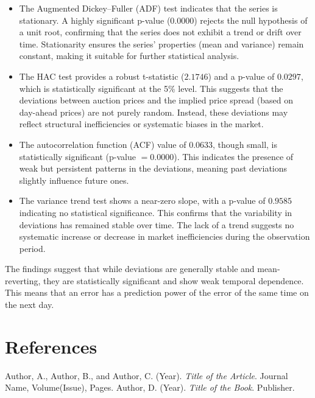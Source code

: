 \documentclass[12pt]{article}
\begin{document}
\begin{itemize}
    \item The Augmented Dickey--Fuller (ADF) test indicates that the series is stationary. A highly significant p-value ($0.0000$) rejects the null hypothesis of a unit root, confirming that the series does not exhibit a trend or drift over time. Stationarity ensures the series' properties (mean and variance) remain constant, making it suitable for further statistical analysis.

    \item The HAC test provides a robust t-statistic ($2.1746$) and a p-value of $0.0297$, which is statistically significant at the 5\% level. This suggests that the deviations between auction prices and the implied price spread (based on day-ahead prices) are not purely random. Instead, these deviations may reflect structural inefficiencies or systematic biases in the market.

    \item The autocorrelation function (ACF) value of $0.0633$, though small, is statistically significant (p-value $= 0.0000$). This indicates the presence of weak but persistent patterns in the deviations, meaning past deviations slightly influence future ones.

    \item The variance trend test shows a near-zero slope, with a p-value of $0.9585$ indicating no statistical significance. This confirms that the variability in deviations has remained stable over time. The lack of a trend suggests no systematic increase or decrease in market inefficiencies during the observation period.
\end{itemize}
\noindent The findings suggest that while deviations are generally stable and mean-reverting, they are statistically significant and show weak temporal dependence. This means that an error has a prediction power of the error of the same time on the next day. 


\section{References}

 Author, A., Author, B., and Author, C. (Year). \textit{Title of the Article}. Journal Name, Volume(Issue), Pages.
 Author, D. (Year). \textit{Title of the Book}. Publisher.
\end{document}
